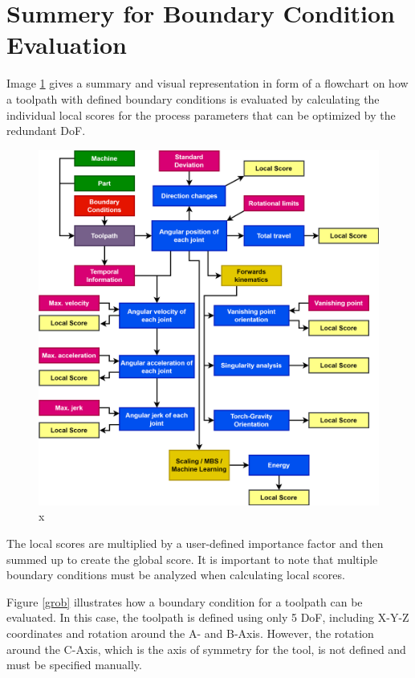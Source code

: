 \newpage
\section{Summery for Boundary Condition Evaluation}



Image \ref{allflow} gives a summary and visual representation in form of a flowchart on how a toolpath with defined boundary conditions is evaluated by calculating the individual local scores for the process parameters that can be optimized by the redundant DoF.

\begin{figure}[H]
	\centerline{\includegraphics[width=1\textwidth]{figures/flowchart.png}}
	\caption{x}
	\label{allflow}
\end{figure}

The local scores are multiplied by a user-defined importance factor and then summed up to create the global score. It is important to note that multiple boundary conditions must be analyzed when calculating local scores.

Figure \ref{grob} illustrates how a boundary condition for a toolpath can be evaluated. In this case, the toolpath is defined using only 5 DoF, including X-Y-Z coordinates and rotation around the A- and B-Axis. However, the rotation around the C-Axis, which is the axis of symmetry for the tool, is not defined and must be specified manually.


